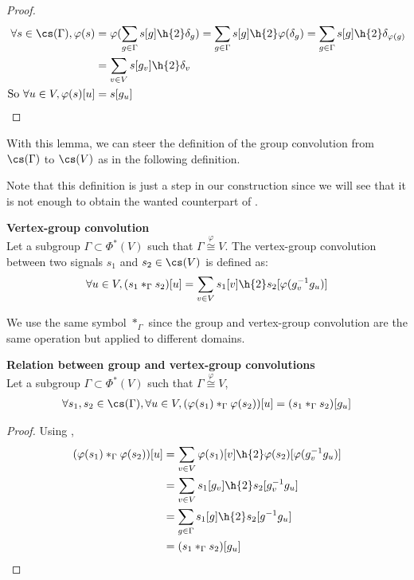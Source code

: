 \begin{proof}
\begin{align*}
\forall s \in \cs(\Gamma), \varphi(s) & = \varphi(\displaystyle \sum_{g \in \Gamma} s[g] \h{2} \delta_g)
 = \displaystyle \sum_{g \in \Gamma} s[g] \h{2} \varphi(\delta_g)
 = \displaystyle \sum_{g \in \Gamma} s[g] \h{2} \delta_{\varphi(g)}\\
 & = \displaystyle \sum_{v \in V} s[g_v] \h{2} \delta_v\\
 \text{So }\forall u \in V, \varphi(s) [u] & = s[g_u]
\end{align*}
\end{proof}

With this lemma, we can steer the definition of the group convolution from $\cs(\Gamma)$ to $\cs(V)$ as in the following definition.

\begin{remark}
Note that this definition is just a step in our construction since we will see that it is not enough to obtain the wanted counterpart of .
\end{remark}

\begin{definition}\textbf{Vertex-group convolution}\\
Let a subgroup $\Gamma \subset \Phi^*(V)$ such that $\Gamma \overset{\varphi}{\cong} V$.
The vertex-group convolution between two signals $s_1$ and $s_2 \in \cs(V)$ is defined as:
\begin{gather*}
\forall u \in V, (s_1 \ast_{\Gamma} s_2) [u] = \displaystyle \sum_{v \in V} s_1[v] \h{2} s_2[\varphi(g_v^{-1}g_u)]
\end{gather*}
\label{def:conv2}
\end{definition}

We use the same symbol $\ast_\Gamma$ since the group and vertex-group convolution are the same operation but applied to different domains.

\begin{lemma}\textbf{Relation between group and vertex-group convolutions}\\
Let a subgroup $\Gamma \subset \Phi^*(V)$ such that $\Gamma \overset{\varphi}{\cong} V$,
\begin{gather*}
\forall s_1, s_2 \in \cs(\Gamma), \forall u \in V,
(\varphi(s_1) \ast_{\Gamma} \varphi(s_2))[u] = (s_1 \ast_{\Gamma} s_2)[g_u]
\end{gather*}
\label{lem:rel12}
\end{lemma}
\begin{proof}
Using ,
\begin{align*}
(\varphi(s_1) \ast_{\Gamma} \varphi(s_2))[u] & = \displaystyle \sum_{v \in V} \varphi(s_1)[v] \h{2} \varphi(s_2)[\varphi(g_v^{-1}g_u)]\\
 & = \displaystyle \sum_{v \in V} s_1[g_v] \h{2} s_2[g_v^{-1}g_u]\\
 & = \displaystyle \sum_{g \in \Gamma} s_1[g] \h{2} s_2[g^{-1}g_u]\\
 & = (s_1 \ast_{\Gamma} s_2)[g_u]
\end{align*}
\end{proof}


